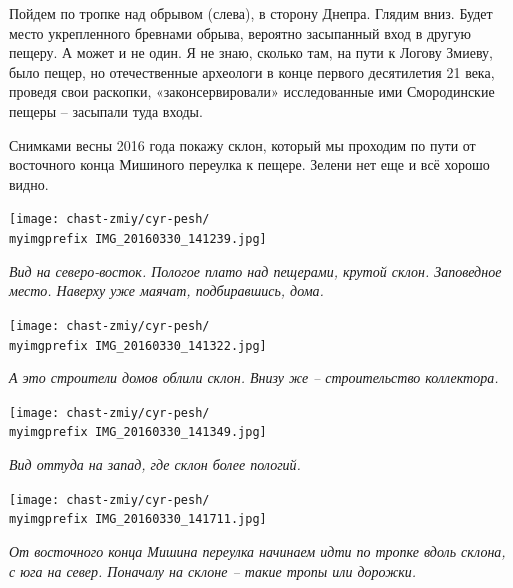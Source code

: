 Пойдем по тропке над обрывом (слева), в сторону Днепра. Глядим вниз. Будет место укрепленного бревнами обрыва, вероятно засыпанный вход в другую пещеру. А может и не один. Я не знаю, сколько там, на пути к Логову Змиеву, было пещер, но отечественные археологи в конце первого десятилетия 21 века, проведя свои раскопки, «законсервировали» исследованные ими Смородинские пещеры – засыпали туда входы.

Снимками весны 2016 года покажу склон, который мы проходим по пути от восточного конца Мишиного переулка к пещере. Зелени нет еще и всё хорошо видно.

\newpage

\begin{center}
\texttt{[image: chast-zmiy/cyr-pesh/\\myimgprefix IMG\_20160330\_141239.jpg]}

\textit{Вид на северо-восток. Пологое плато над пещерами, крутой склон. Заповедное место. Наверху уже маячат, подбиравшись, дома.}
\end{center}

\begin{center}
\texttt{[image: chast-zmiy/cyr-pesh/\\myimgprefix IMG\_20160330\_141322.jpg]}

\textit{А это строители домов облили склон. Внизу же – строительство коллектора.}
\end{center}

\begin{center}
\texttt{[image: chast-zmiy/cyr-pesh/\\myimgprefix IMG\_20160330\_141349.jpg]}

\textit{Вид оттуда на запад, где склон более пологий.}
\end{center}



\begin{center}
\texttt{[image: chast-zmiy/cyr-pesh/\\myimgprefix IMG\_20160330\_141711.jpg]}

\textit{От восточного конца Мишина переулка начинаем идти по тропке вдоль склона, с юга на север. Поначалу на склоне – такие тропы или дорожки.}
\end{center}

